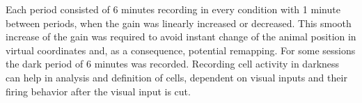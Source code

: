 Each period consisted of 6 minutes recording in every condition with 1 minute between periods, when the gain was linearly increased or decreased. This smooth increase of the gain was required to avoid instant change of the animal position in virtual coordinates and, as a consequence, potential remapping. For some sessions the dark period of 6 minutes was recorded. Recording cell activity in darkness can help in analysis and definition of cells, dependent on visual inputs and their firing behavior after the visual input is cut.

\begin{figure}
\captionsetup{format=plain}
\caption[vGAIN experiment]{
}
\end{figure}

